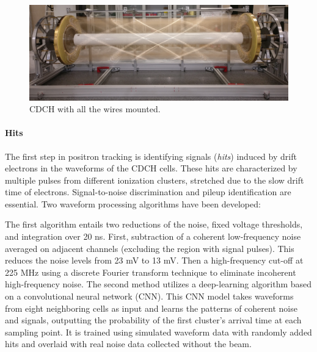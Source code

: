 \begin{refsection}
        \begin{figure}
            \centering
            \includegraphics[width = \textwidth]{Figures/MEG/CDCH.png}
            \caption{CDCH with all the wires mounted.}
            \label{fig:MEGII:CDCH}
        \end{figure}

        \paragraph{Hits} The first step in positron tracking is identifying signals (\textit{hits}) induced by drift electrons in the waveforms of the CDCH cells.
        These hits are characterized by multiple pulses from different ionization clusters, stretched due to the slow drift time of electrons.
        Signal-to-noise discrimination and pileup identification are essential. 
        Two waveform processing algorithms have been developed:
        \begin{outline}
            \1 The first algorithm entails two reductions of the noise, fixed voltage thresholds, and integration over 20 ns.
            First, subtraction of a coherent low-frequency noise averaged on adjacent channels (excluding the region with signal pulses).
            This reduces the noise levels from 23 mV to 13 mV.
            Then a high-frequency cut-off at 225 MHz using a discrete Fourier transform technique to eliminate incoherent high-frequency noise.
            \1 The second method utilizes a deep-learning algorithm based on a convolutional neural network (CNN). This CNN model takes waveforms from eight neighboring cells as input and learns the patterns of coherent noise and signals, outputting the probability of the first cluster's arrival time at each sampling point. It is trained using simulated waveform data with randomly added hits and overlaid with real noise data collected without the beam.
        \end{outline}
        

\end{refsection}
